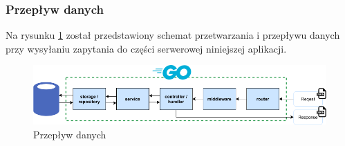 \subsubsection{Przepływ danych}
Na rysunku \ref{fig:backend_data_flow} został przedstawiony schemat przetwarzania i przepływu danych przy wysyłaniu zapytania do części serwerowej niniejszej aplikacji.
\begin{figure}[ht]
\centering
\includegraphics[width=1\linewidth]{rys03/backend_data_flow.png}
\caption{Przepływ danych}
\label{fig:backend_data_flow}
\end{figure}

% 
